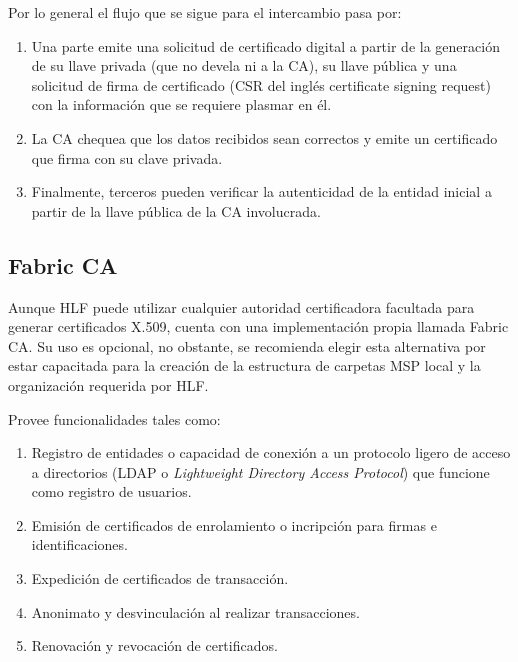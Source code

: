 Por lo general el flujo que se sigue para el intercambio pasa por:

\begin{enumerate}
	\item Una parte emite una solicitud de certificado digital a partir de la generaci\'on de su llave privada (que no devela ni a la CA), su llave p\'ublica y una solicitud de firma de certificado (CSR del ingl\'es certificate signing request) con la informaci\'on que se requiere plasmar en \'el.
	
	\item La CA chequea que los datos recibidos sean correctos y emite un certificado que firma con su clave privada.
	
	\item Finalmente, terceros pueden verificar la autenticidad de la entidad inicial a partir de la llave p\'ublica de la CA involucrada.
\end{enumerate}


\subsection{Fabric CA}

Aunque HLF puede utilizar cualquier autoridad certificadora facultada para generar certificados X.509, cuenta con una implementaci\'on propia llamada Fabric CA. Su uso es opcional, no obstante, se recomienda elegir esta alternativa por estar capacitada para la creaci\'on de la estructura de carpetas MSP local y la organizaci\'on requerida por HLF.%

Provee funcionalidades tales como:
\begin{enumerate}
	\item Registro de entidades o capacidad de conexi\'on a un protocolo ligero de acceso a directorios (LDAP o \emph{Lightweight Directory Access Protocol}) que funcione como registro de usuarios.
	
	\item Emisi\'on de certificados de enrolamiento o incripci\'on para firmas e identificaciones.%
	
	\item Expedici\'on de certificados de transacci\'on.
	
	\item Anonimato y desvinculaci\'on al realizar transacciones.
	
	\item Renovaci\'on y revocaci\'on de certificados.
\end{enumerate}

